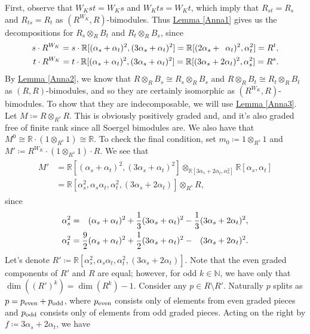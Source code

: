 \begin{example}
\newpage
\noindent First, observe that $W_Kst = W_Ks$ and $W_Kts = W_Kt$, which imply that $R_{st} = R_s$ and $R_{ts} = R_t$ as $(R^{W_K}, R)$-bimodules. Thus \hyperref[Anna1]{Lemma \ref*{Anna1}} gives us the decompositions for $R_s \otimes_R B_t$ and $R_t \otimes_R B_s$, since
\begin{align*}
\begin{split}
s\cdot R^{W_K} = s\cdot\mathbb{R}[(\alpha_s+\alpha_t)^2, (3\alpha_s+\alpha_t)^2] = \mathbb{R}[(2\alpha_s+\hphantom{2}\alpha_t)^2, \alpha_t^2] = R^t,\\
t\cdot R^{W_K} = t\cdot\mathbb{R}[(\alpha_s+\alpha_t)^2, (3\alpha_s+\alpha_t)^2] = \mathbb{R}[(3\alpha_s+2\alpha_t)^2, \alpha_s^2] = R^s.
\end{split}
\end{align*}
\noindent By \hyperref[Anna2]{Lemma \ref*{Anna2}}, we know that $R \otimes_R B_s \cong R_s \otimes_R B_s$ and $R \otimes_R B_t \cong R_t \otimes_R B_t$ as $(R, R)$-bimodules, and so they are certainly isomorphic as $(R^{W_K}, R)$-bimodules. To show that they are indecomposable, we will use \hyperref[Anna3]{Lemma \ref*{Anna3}}. Let $M \coloneqq R \otimes_{R^s} R$. This is obviously positively graded and, and it's also graded free of finite rank since all Soergel bimodules are. We also have that $M^0 \cong \mathbb{R}\cdot (1\otimes_{R^s} 1) \cong \mathbb{R}$. To check the final condition, set $m_0 \coloneqq 1 \otimes_{R^s} 1$ and $M' \coloneqq R^{W_K}\cdot (1 \otimes_{R^s} 1) \cdot R$. We see that
\begin{align*}
\begin{split}
M' &= \mathbb{R}[(\alpha_s+\alpha_t)^2, (3\alpha_s+\alpha_t)^2] \otimes_{\mathbb{R}[3\alpha_s+2\alpha_t, \alpha_s^2]} \mathbb{R}[\alpha_s, \alpha_t]\\
&= \mathbb{R}[\alpha_s^2, \alpha_s\alpha_t, \alpha_t^2, (3\alpha_s+2\alpha_t)] \otimes_{R^s} R,
\end{split}
\end{align*}
\noindent since
\begin{align*}
\begin{split}
\alpha_s^2 &= \hphantom{\frac{9}{2}}(\alpha_s+\alpha_t)^2 + \frac{1}{3}(3\alpha_s+\alpha_t)^2 - \frac{1}{3}(3\alpha_s+2\alpha_t)^2,\\
\alpha_t^2 &= \frac{9}{2}(\alpha_s+\alpha_t)^2 + \frac{1}{2}(3\alpha_s+\alpha_t)^2 - \hphantom{\frac{1}{3}}(3\alpha_s+2\alpha_t)^2.
\end{split}
\end{align*}
\noindent Let's denote $R' \coloneqq \mathbb{R}[\alpha_s^2, \alpha_s\alpha_t, \alpha_t^2, (3\alpha_s+2\alpha_t)]$. Note that the even graded components of $R'$ and $R$ are equal; however, for odd $k \in \mathbb{N}$, we have only that $\dim((R')^k) = \dim(R^k)-1$. Consider any $p \in R\setminus R'$. Naturally $p$ splits as $p = p_\textup{even} + p_\textup{odd}$, where $p_\textup{even}$ consists only of elements from even graded pieces and $p_\textup{odd}$ consists only of elements from odd graded pieces. Acting on the right by $f \coloneqq 3\alpha_s + 2\alpha_t$, we have

\end{example}
